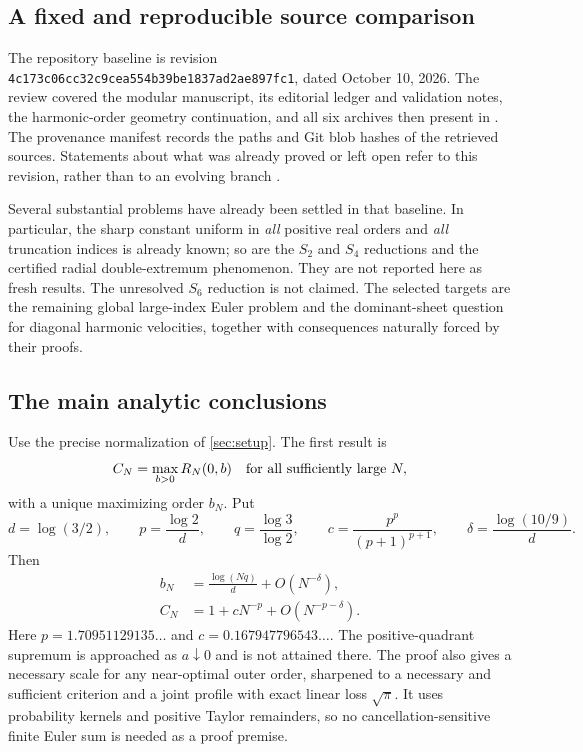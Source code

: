 \documentclass[11pt]{article}
\numberwithin{equation}{section}
\theoremstyle{definition}
\theoremstyle{remark}
\newcommand{\src}[1]{\texttt{\detokenize{#1}}}
\begin{document}
\subsection{A fixed and reproducible source comparison}

The repository baseline is revision
\texttt{4c173c06cc32c9cea554b39be1837ad2ae897fc1},
dated October 10, 2026. The review covered the modular manuscript,
its editorial ledger and validation notes, the harmonic-order geometry
continuation, and all six archives then present in \src{docs/incoming}.
The provenance manifest records the paths and Git blob hashes of the
retrieved sources. Statements about what was already proved or left
open refer to this revision, rather than to an evolving branch
\cite{ProveItSnapshot,HarmonicBaseline,UniformBoundsIncoming,SharpEulerIncoming}.

Several substantial problems have already been settled in that baseline.
In particular, the sharp constant uniform in \emph{all} positive real
orders and \emph{all} truncation indices is already known; so are the
$S_2$ and $S_4$ reductions and the certified radial double-extremum
phenomenon. They are not reported here as fresh results. The unresolved
$S_6$ reduction is not claimed. The selected targets are the remaining
global large-index Euler problem and the dominant-sheet question for
diagonal harmonic velocities, together with consequences naturally
forced by their proofs.

\subsection{The main analytic conclusions}

Use the precise normalization of \cref{sec:setup}. The first result is
\[
 C_N=\max_{b>0}R_N(0,b)\quad\hbox{for all sufficiently large }N,
\]
with a unique maximizing order $b_N$. Put
\[
 d=\log(3/2),\qquad p=\frac{\log2}{d},\qquad
 q=\frac{\log3}{\log2},\qquad
 c=\frac{p^p}{(p+1)^{p+1}},\qquad
 \delta=\frac{\log(10/9)}d.
\]
Then
\begin{align}
 b_N&=\frac{\log(Nq)}d+O(N^{-\delta}),\label{eq:intro-b}\\
 C_N&=1+cN^{-p}+O(N^{-p-\delta}).\label{eq:intro-C}
\end{align}
Here $p=1.70951129135\ldots$ and $c=0.167947796543\ldots$.
The positive-quadrant supremum is approached as $a\downarrow0$ and is
not attained there. The proof also gives a necessary scale for any
near-optimal outer order, sharpened to a necessary and sufficient
criterion and a joint profile with exact linear loss $\sqrt\pi$.
It uses probability kernels and positive
Taylor remainders, so no cancellation-sensitive finite Euler sum is
needed as a proof premise.
\end{document}
